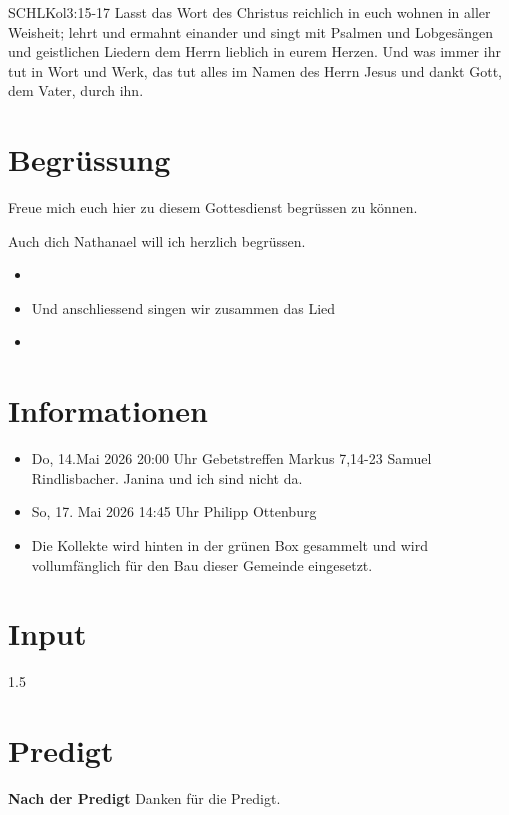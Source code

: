 \documentclass[fontsize=14pt]{mybib}
\newcommand{\Name}{Nathanael}
\begin{document}
\begin{bibelbox}{SCHL}{Kol}{3:15-17}
    Lasst das Wort des Christus reichlich in euch wohnen in aller Weisheit; lehrt und ermahnt einander und singt mit Psalmen und Lobgesängen und geistlichen Liedern dem Herrn lieblich in eurem Herzen. Und was immer ihr tut in Wort und Werk, das tut alles im Namen des Herrn Jesus und dankt Gott, dem Vater, durch ihn.
\end{bibelbox}
\section{Begrüssung}
Freue mich euch hier zu diesem Gottesdienst begrüssen zu können.

Auch dich \Name{} will ich herzlich begrüssen.
\begin{itemize}
    \item[] 
    \item[] Und anschliessend singen wir zusammen das Lied
    \item[] \lied[b]{}
\end{itemize}

\section{Informationen}
\begin{itemize}
    \item {} Do, 14.Mai 2026 20:00 Uhr Gebetstreffen Markus 7,14-23 Samuel Rindlisbacher. Janina und ich sind nicht da.
    \item {} So, 17. Mai 2026 14:45 Uhr Philipp Ottenburg

    \item {} Die Kollekte wird hinten in der grünen Box gesammelt und wird vollumfänglich für den Bau dieser Gemeinde eingesetzt.
\end{itemize}

\section{ Input }
\begin{spacing}{1.5}
    
\end{spacing}
\section{Predigt}
\textbf{Nach der Predigt}\newline
Danken für die Predigt.
\end{document}
